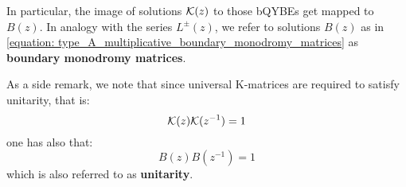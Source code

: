         In particular, the image of solutions $\mathcal{K}(z)$ to those bQYBEs get mapped to $B(z)$. In analogy with the series $L^{\pm}(z)$, we refer to solutions $B(z)$ as in \eqref{equation: type_A_multiplicative_boundary_monodromy_matrices} as \textbf{boundary monodromy matrices}.
        \begin{remark}
            As a side remark, we note that since universal K-matrices are required to satisfy unitarity, that is:
                $$\mathcal{K}(z) \mathcal{K}(z^{-1}) = 1$$
            one has also that:
                \begin{equation} \label{equation: type_A_multiplicative_boundary_monodromy_matrices_unitarity}
                    B(z) B(z^{-1}) = 1
                \end{equation}
            which is also referred to as \textbf{unitarity}.
        \end{remark}
        
